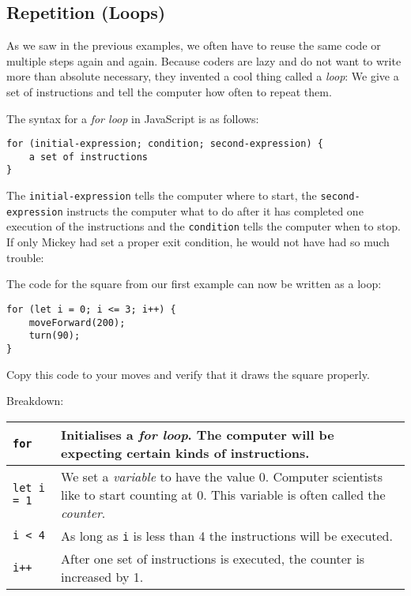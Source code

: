 \documentclass[english,11pt,a4paper]{report}
\begin{document}
\subsection{Repetition (Loops)}

As we saw in the previous examples, we often have to reuse the same code or multiple steps again and again.  Because coders are lazy and do not want to write more than absolute necessary, they invented a cool thing called a \emph{loop}: We give a set of instructions and tell the computer how often to repeat them. 

The syntax for a \emph{for loop} in JavaScript is as follows:
\begin{verbatim}
for (initial-expression; condition; second-expression) {
	a set of instructions
}
\end{verbatim}
The \verb|initial-expression| tells the computer where to start, the \verb|second-expression| instructs the computer what to do after it has completed one execution of the instructions and the \verb|condition| tells the computer when to stop. If only Mickey had set a proper exit condition, he would not have had so much trouble:

The code for the square from our first example can now be written as a loop:
\begin{verbatim}
for (let i = 0; i <= 3; i++) {
    moveForward(200);
    turn(90);
}
\end{verbatim}
Copy this code to your moves and verify that it draws the square properly.

Breakdown:
\begin{center}
\begin{tabular}{p{3cm}|p{8cm}}
\verb|for| & Initialises a \emph{for loop}. The computer will be expecting certain kinds of instructions.\\
\hline
\verb|let i = 1| & We set a \emph{variable} to have the value 0. Computer scientists like to start counting at 0.  This variable is often called the \emph{counter}.\\
\hline
\verb|i < 4| & As long as \verb|i| is less than 4 the instructions will be executed. \\
\hline
\verb|i++| & After one set of instructions is executed, the counter is increased by 1. 
\end{tabular}
\end{center}

\end{document}
